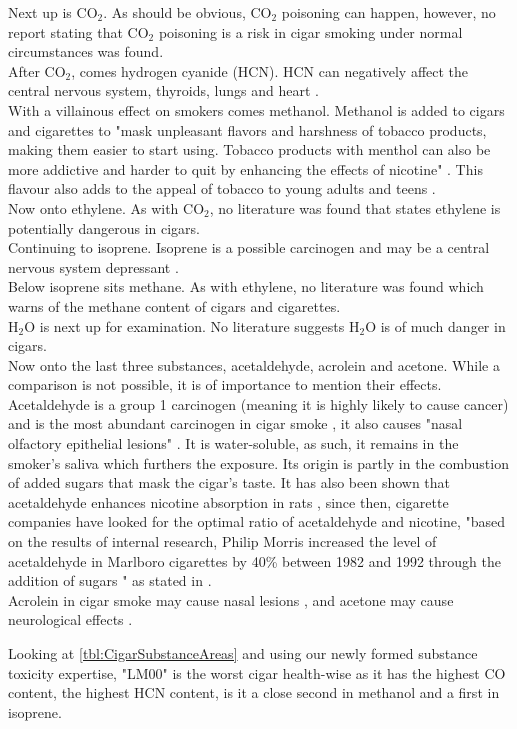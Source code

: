 \documentclass[reprint,amsmath,amssymb,aps, prl,superscriptaddress]{revtex4-2}
\begin{document}
Next up is $\text{CO}_{2}$. As should be obvious, $\text{CO}_{2}$ poisoning can happen, however, no report stating that $\text{CO}_{2}$ poisoning is a risk in cigar smoking under normal circumstances was found. \\
After $\text{CO}_{2}$, comes hydrogen cyanide (HCN). HCN can negatively affect the central nervous system, thyroids, lungs and heart \cite{SubstanceDangerPaper}\cite{PubChemHCN}.\\
With a villainous effect on smokers comes methanol. Methanol is added to cigars and cigarettes to "mask unpleasant flavors and harshness of tobacco products, making them easier to start using. Tobacco products with menthol can also be more addictive and harder to quit by enhancing the effects of nicotine" \cite{MethanolFDA}. This flavour also adds to the appeal of tobacco to young adults and teens \cite{MethanolFDA}.\\
Now onto ethylene. As with $\text{CO}_2$, no literature was found that states ethylene is potentially dangerous in cigars.\\
Continuing to isoprene. Isoprene is a possible carcinogen and may be a central nervous system depressant \cite{PubChemIsoprene}.\\
Below isoprene sits methane. As with ethylene, no literature was found which warns of the methane content of cigars and cigarettes. \\
$\text{H}_2\text{O}$ is next up for examination. No literature suggests $\text{H}_2\text{O}$ is of much danger in cigars. \\
Now onto the last three substances, acetaldehyde, acrolein and acetone. While a comparison is not possible, it is of importance to mention their effects. Acetaldehyde is a group 1 carcinogen (meaning it is highly likely to cause cancer) and is the most abundant carcinogen in cigar smoke \cite{AcetaldehydeIARC}\cite{AcetaldehydeInCigars}, it also causes "nasal olfactory epithelial lesions" \cite{SubstanceDangerPaper}.
% 
It is water-soluble, as such, it remains in the smoker's saliva which furthers the exposure. Its origin is partly in the combustion of added sugars that mask the cigar's taste. It has also been shown that acetaldehyde enhances nicotine absorption in rats \cite{AcetaldehydeInRats}, since then, cigarette companies have looked for the optimal ratio of acetaldehyde and nicotine, "based on the results of internal research, Philip Morris increased the level of acetaldehyde in Marlboro cigarettes by 40\% between 1982 and 1992 through the addition of sugars \cite{FortyPercentIncrease}" as stated in \cite{CigarCompaniesInternal}.\\ 
Acrolein in cigar smoke may cause nasal lesions \cite{SubstanceDangerPaper}, and acetone may cause neurological effects \cite{SubstanceDangerPaper}.

Looking at \ref{tbl:CigarSubstanceAreas} and using our newly formed substance toxicity expertise, "LM00" is the worst cigar health-wise as it has the highest CO content, the highest HCN content, is it a close second in methanol and a first in isoprene.


\end{document}
